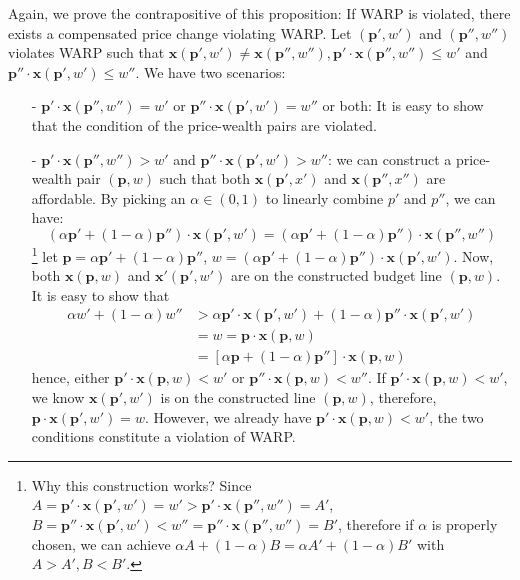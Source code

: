 \begin{description}
    Again, we prove the contrapositive of this proposition: If WARP is violated, there exists a compensated price change violating WARP. Let $(\mathbf{p}',w')$ and $(\mathbf{p}'',w'')$ violates WARP such that $\mathbf{x}(\mathbf{p}',w')\neq \mathbf{x}(\mathbf{p}'',w''),\mathbf{p}'\cdot\mathbf{x}(\mathbf{p}'',w'')\leq w'$ and $\mathbf{p}''\cdot\mathbf{x}(\mathbf{p}',w')\leq w''$. We have two scenarios:
    \begin{enumerate}
        \item[-] $\mathbf{p}'\cdot\mathbf{x}(\mathbf{p}'',w'')= w'$ or $\mathbf{p}''\cdot\mathbf{x}(\mathbf{p}',w')= w''$ or both: It is easy to show that the condition of the price-wealth pairs are violated.
        \item[-] $\mathbf{p}'\cdot\mathbf{x}(\mathbf{p}'',w'')> w'$ and $\mathbf{p}''\cdot\mathbf{x}(\mathbf{p}',w')>w''$: we can construct a price-wealth pair $(\mathbf{p},w)$ such that both $\mathbf{x}(\mathbf{p}',x')$ and $\mathbf{x}(\mathbf{p}'',x'')$ are affordable. By picking an $\alpha \in (0,1)$ to linearly combine $p'$ and $p''$, we can have:
        $$(\alpha \mathbf{p}'+(1-\alpha)\mathbf{p}'')\cdot \mathbf{x}(\mathbf{p}',w')= (\alpha \mathbf{p}'+(1-\alpha)\mathbf{p}'')\cdot \mathbf{x}(\mathbf{p}'',w'')$$\footnote{Why this construction works? Since $A = \mathbf{p}'\cdot \mathbf{x}(\mathbf{p}',w')= w'> \mathbf{p}'\cdot \mathbf{x}(\mathbf{p}'',w'')=A'$, $B=\mathbf{p}''\cdot \mathbf{x}(\mathbf{p}',w')<w''= \mathbf{p}''\cdot \mathbf{x}(\mathbf{p}'',w'')=B'$, therefore if $\alpha$ is properly chosen, we can achieve $\alpha A+(1-\alpha)B = \alpha A'+(1-\alpha) B'$ with $A>A',B<B'$.}
        let $\mathbf{p}=\alpha \mathbf{p}'+(1-\alpha)\mathbf{p}''$, $w=(\alpha \mathbf{p}'+(1-\alpha)\mathbf{p}'')\cdot \mathbf{x}(\mathbf{p}',w')$. Now, both $\mathbf{x}(\mathbf{p},w)$ and $\mathbf{x}'(\mathbf{p}',w')$ are on the constructed budget line $(\mathbf{p},w)$. It is easy to show that
        \begin{align*}
            \alpha w'+(1-\alpha)w'' &> \alpha \mathbf{p}'\cdot\mathbf{x}(\mathbf{p}',w')+(1-\alpha) \mathbf{p}''\cdot \mathbf{x}(\mathbf{p}',w') \\
            & = w=\mathbf{p}\cdot \mathbf{x}(\mathbf{p},w)\\
            & = \left[ \alpha \mathbf{p}+(1-\alpha) \mathbf{p}''\right]\cdot \mathbf{x}(\mathbf{p},w)
        \end{align*}
        hence, either $\mathbf{p}'\cdot \mathbf{x}(\mathbf{p},w)<w'$ or $\mathbf{p}''\cdot \mathbf{x}(\mathbf{p},w)<w''$. If $\mathbf{p}'\cdot\mathbf{x}(\mathbf{p},w)<w'$, we know $\mathbf{x}(\mathbf{p}',w')$ is on the constructed line $(\mathbf{p},w)$, therefore, $\mathbf{p}\cdot \mathbf{x}(\mathbf{p}',w')=w$. However, we already have $\mathbf{p}'\cdot \mathbf{x}(\mathbf{p},w)<w'$, the two conditions constitute a violation of WARP.
    \end{enumerate} 


\end{description}
